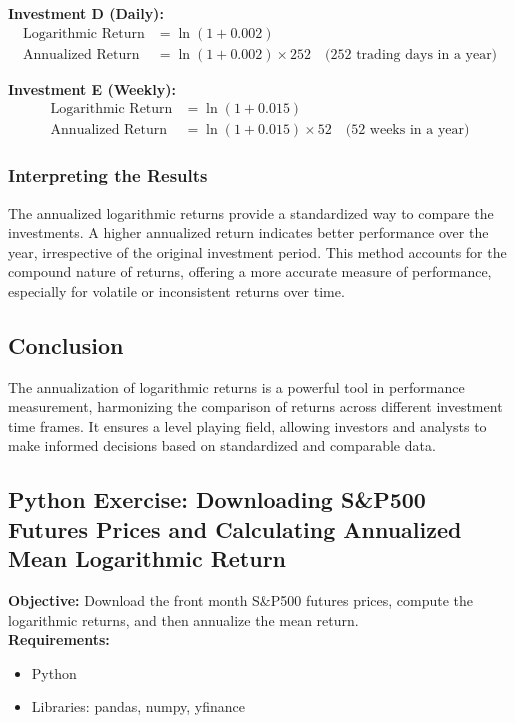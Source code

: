 \documentclass{article}
\begin{document}
\textbf{Investment D (Daily):}
\begin{align*}
    \text{Logarithmic Return} &= \ln(1 + 0.002) \\
    \text{Annualized Return} &= \ln(1 + 0.002) \times 252 \quad \text{(252 trading days in a year)}
\end{align*}

\textbf{Investment E (Weekly):}
\begin{align*}
    \text{Logarithmic Return} &= \ln(1 + 0.015) \\
    \text{Annualized Return} &= \ln(1 + 0.015) \times 52 \quad \text{(52 weeks in a year)}
\end{align*}

\subsubsection*{Interpreting the Results}

The annualized logarithmic returns provide a standardized way to compare the investments. A higher annualized return indicates better performance over the year, irrespective of the original investment period. This method accounts for the compound nature of returns, offering a more accurate measure of performance, especially for volatile or inconsistent returns over time.

\subsection{Conclusion}

The annualization of logarithmic returns is a powerful tool in performance measurement, harmonizing the comparison of returns across different investment time frames. It ensures a level playing field, allowing investors and analysts to make informed decisions based on standardized and comparable data.

\subsection{Python Exercise: Downloading S\&P500 Futures Prices and Calculating Annualized Mean Logarithmic Return}

\textbf{Objective:} Download the front month S\&P500 futures prices, compute the logarithmic returns, and then annualize the mean return. \\

\textbf{Requirements:}
\begin{itemize}
    \item Python
    \item Libraries: pandas, numpy, yfinance
\end{itemize}
\end{document}

